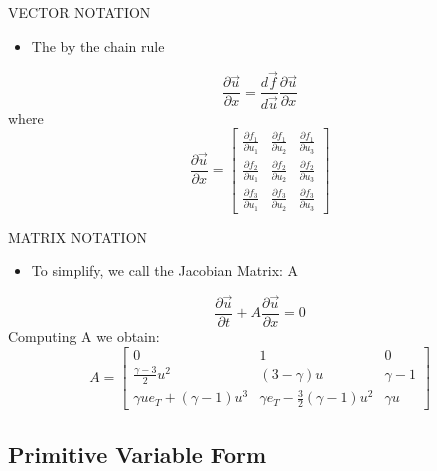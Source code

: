 \documentclass{beamer}
\begin{document}
\begin{frame}{VECTOR NOTATION}
  \begin{itemize}
   \item The by the chain rule
  \end{itemize}
  \begin{equation}
   \frac{\partial{\vec{u}}}{\partial{x}}=\frac{d\vec{f}}{d\vec{u}}\frac{\partial{\vec{u}}}{\partial{x}}
  \end{equation}
  where
  \begin{equation}
    \frac{\partial{\vec{u}}}{\partial{x}}=\begin{bmatrix}
    \frac{\partial{f_1}}{\partial{u_1}} & \frac{\partial{f_1}}{\partial{u_2}} & \frac{\partial{f_1}}{\partial{u_3}}\\ 
    \frac{\partial{f_2}}{\partial{u_1}} & \frac{\partial{f_2}}{\partial{u_2}} & \frac{\partial{f_2}}{\partial{u_3}}\\ 
    \frac{\partial{f_3}}{\partial{u_1}} & \frac{\partial{f_3}}{\partial{u_2}} & \frac{\partial{f_3}}{\partial{u_3}}
    \end{bmatrix}
  \end{equation}
\end{frame}

\begin{frame}{MATRIX NOTATION}
  \begin{itemize}
   \item To simplify, we call the Jacobian Matrix: A
  \end{itemize}
  \begin{equation}
    \frac{\partial{\vec{u}}}{\partial{t}}+A\frac{\partial{\vec{u}}}{\partial{x}}=0
  \end{equation}
  Computing A we obtain:
  \begin{equation}
   A=\begin{bmatrix}
    0 & 1 & 0\\ 
    \frac{\gamma-3}{2}u^2 & (3-\gamma)u & \gamma-1\\ 
    {\gamma}{u}e_T+(\gamma-1)u^3 & {\gamma}e_T-\frac{3}{2}(\gamma-1)u^2 & {\gamma}u
    \end{bmatrix}
  \end{equation}
\end{frame}

\subsection{Primitive Variable Form}
\end{document}
